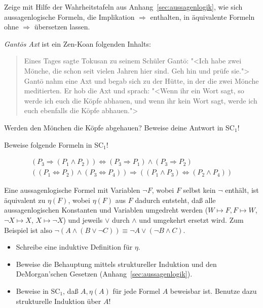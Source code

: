 \begin{aufgabe}
  Zeige mit Hilfe der Wahrheitstafeln aus
  Anhang~\ref{sec:aussagenlogik}, wie sich aussagenlogische
  Formeln, die Implikation $\Rightarrow$ enthalten, in äquivalente
  Formeln ohne $\Rightarrow$ übersetzen lassen.
\end{aufgabe}

\begin{aufgabe}
  \textit{Gant\=os Axt} ist ein Zen-Koan folgenden Inhalts:
  \begin{quote}
    Eines Tages sagte Tokusan zu seinem Schüler Gant\=o: "<Ich habe
    zwei Mönche, die schon seit vielen Jahren hier sind.  Geh hin und
    prüfe sie."> Gant\=o nahm eine Axt und begab sich zu der Hütte, in
    der die zwei Mönche meditierten.  Er hob die Axt und sprach:
    "<Wenn ihr ein Wort sagt, so werde ich euch die Köpfe abhauen, und
    wenn ihr kein Wort sagt, werde ich euch ebenfalls die Köpfe
    abhauen.">
  \end{quote}
  Werden den Mönchen die Köpfe abgehauen?  Beweise deine Antwort in
  SC$_1$!
\end{aufgabe}

\begin{aufgabe}
  Beweise folgende Formeln in SC$_1$!

    \begin{displaymath}
      \begin{array}{c}
      (P_3\Rightarrow(P_1\wedge P_2))\Leftrightarrow (P_3\Rightarrow P_1)\wedge
      (P_3\Rightarrow P_2)
      \\[1.5ex]
      ((P_1 \Leftrightarrow P_2)\wedge(P_3\Leftrightarrow
      P_4))\Rightarrow((P_1\wedge P_3)\Leftrightarrow (P_2\wedge P_4))
    \end{array}
  \end{displaymath}
\end{aufgabe}

\begin{aufgabe}\label{ex:negation}
 Eine aussagenlogische Formel mit Variablen $\neg
  F$, wobei $F$ selbst kein $\neg$ enthält, ist äquivalent zu $\eta(F)$, wobei $\eta(F)$ aus $F$ dadurch
  entsteht, daß alle aussagenlogischen Konstanten und Variablen umgedreht werden
  ($W\mapsto F, F\mapsto W$, $\neg X\mapsto X$, $X \mapsto \neg X$)
  und jeweils $\vee$ durch  $\wedge$ und umgekehrt ersetzt wird.  Zum
  Beispiel ist also $\neg(A\wedge(B\vee \neg C)) \equiv \neg A\vee (\neg B\wedge C)$.

  \begin{itemize}
  \item Schreibe eine induktive Definition für $\eta$.
  \item Beweise die Behauptung mittels struktureller Induktion und den
    DeMorgan'schen Gesetzen (Anhang~\ref{sec:aussagenlogik}).
    \item Beweise in SC$_1$, daß $A,\eta(A)$ für
    jede Formel $A$ beweisbar ist.
    Benutze dazu strukturelle Induktion über
    $A$!
  \end{itemize}
\end{aufgabe}

